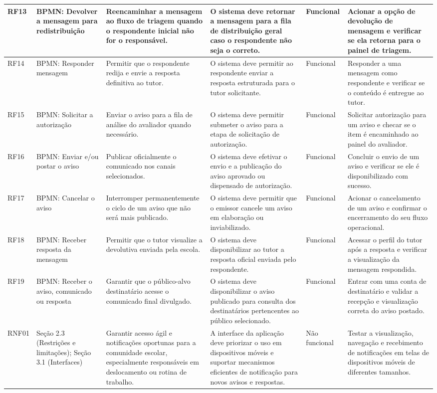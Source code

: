 \documentclass[a4paper,12pt]{report}
\begin{document}
\begin{longtable}{|p{1.1cm}|p{2.5cm}|p{2.8cm}|p{3.4cm}|p{1.6cm}|p{3.0cm}|}
\hline
RF13 & BPMN: Devolver a mensagem para redistribuição & Reencaminhar a mensagem ao fluxo de triagem quando o respondente inicial não for o responsável. & O sistema deve retornar a mensagem para a fila de distribuição geral caso o respondente não seja o correto. & Funcional & Acionar a opção de devolução de mensagem e verificar se ela retorna para o painel de triagem. \\
\hline
RF14 & BPMN: Responder mensagem & Permitir que o respondente redija e envie a resposta definitiva ao tutor. & O sistema deve permitir ao respondente enviar a resposta estruturada para o tutor solicitante. & Funcional & Responder a uma mensagem como respondente e verificar se o conteúdo é entregue ao tutor. \\
\hline
RF15 & BPMN: Solicitar a autorização & Enviar o aviso para a fila de análise do avaliador quando necessário. & O sistema deve permitir submeter o aviso para a etapa de solicitação de autorização. & Funcional & Solicitar autorização para um aviso e checar se o item é encaminhado ao painel do avaliador. \\
\hline
RF16 & BPMN: Enviar e/ou postar o aviso & Publicar oficialmente o comunicado nos canais selecionados. & O sistema deve efetivar o envio e a publicação do aviso aprovado ou dispensado de autorização. & Funcional & Concluir o envio de um aviso e verificar se ele é disponibilizado com sucesso. \\
\hline
RF17 & BPMN: Cancelar o aviso & Interromper permanentemente o ciclo de um aviso que não será mais publicado. & O sistema deve permitir que o emissor cancele um aviso em elaboração ou inviabilizado. & Funcional & Acionar o cancelamento de um aviso e confirmar o encerramento do seu fluxo operacional. \\
\hline
RF18 & BPMN: Receber resposta da mensagem & Permitir que o tutor visualize a devolutiva enviada pela escola. & O sistema deve disponibilizar ao tutor a resposta oficial enviada pelo respondente. & Funcional & Acessar o perfil do tutor após a resposta e verificar a visualização da mensagem respondida. \\
\hline
RF19 & BPMN: Receber o aviso, comunicado ou resposta & Garantir que o público-alvo destinatário acesse o comunicado final divulgado. & O sistema deve disponibilizar o aviso publicado para consulta dos destinatários pertencentes ao público selecionado. & Funcional & Entrar com uma conta de destinatário e validar a recepção e visualização correta do aviso postado. \\
\hline
RNF01 & Seção 2.3 (Restrições e limitações); Seção 3.1 (Interfaces) & Garantir acesso ágil e notificações oportunas para a comunidade escolar, especialmente responsáveis em deslocamento ou rotina de trabalho. & A interface da aplicação deve priorizar o uso em dispositivos móveis e suportar mecanismos eficientes de notificação para novos avisos e respostas. & Não funcional & Testar a visualização, navegação e recebimento de notificações em telas de dispositivos móveis de diferentes tamanhos. \\

\end{longtable}
\end{document}
